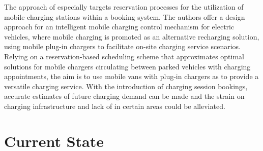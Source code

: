 The approach of \cite{zhang_mobile_2020} especially targets reservation processes for the utilization of mobile charging stations within a booking system.
The authors offer a design approach for an intelligent mobile charging control mechanism for electric vehicles, where mobile charging is promoted as an alternative recharging solution, using mobile plug-in chargers to facilitate on-site charging service scenarios.
Relying on a reservation-based scheduling scheme that approximates optimal solutions for mobile chargers circulating between parked vehicles with charging appointments, the aim is to use mobile vans with plug-in chargers as  to provide a versatile charging service.
With the introduction of charging session bookings, accurate estimates of future charging demand can be made and the strain on charging infrastructure and lack of  in certain areas could be alleviated.

\section{Current State}
\label{ch:Literature Review:sec:Current State}

